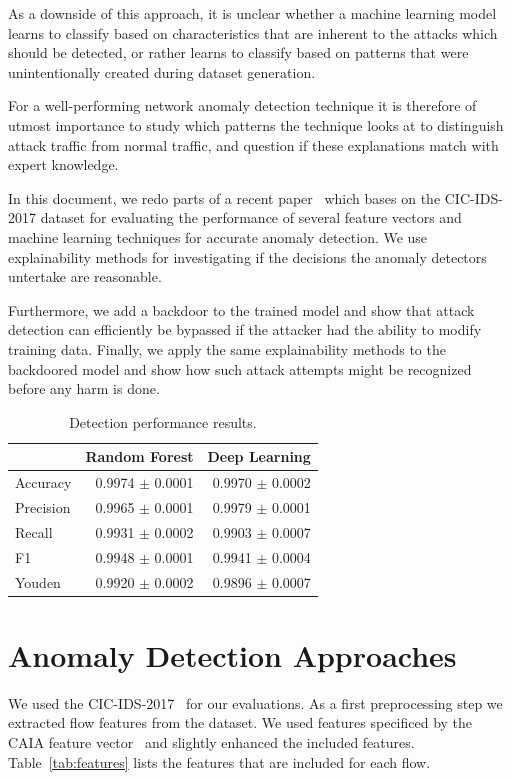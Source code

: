 \documentclass[sigconf,nonacm]{acmart}
\begin{document}
As a downside of this approach, it is unclear whether a machine learning model learns to classify based on characteristics that are inherent to the attacks which should be detected, or rather learns to classify based on patterns that were unintentionally created during dataset generation.

For a well-performing network anomaly detection technique it is therefore of utmost importance to study which patterns the technique looks at to distinguish attack traffic from normal traffic, and question if these explanations match with expert knowledge.

In this document, we redo parts of a recent paper~\cite{fares} which bases on the CIC-IDS-2017 dataset \cite{Sharafaldin2018} for evaluating the performance of several feature vectors and machine learning techniques for accurate anomaly detection. We use explainability methods for investigating if the decisions the anomaly detectors untertake are reasonable.

Furthermore, we add a backdoor to the trained model and show that attack detection can efficiently be bypassed if the attacker had the ability to modify training data. Finally, we apply the same explainability methods to the backdoored model and show how such attack attempts might be recognized before any harm is done.


\begin{table}[b]
\caption{Detection performance results.} \label{tab:performance_results}
\begin{tabular}{l r r} \toprule
& Random Forest & Deep Learning \\ \midrule
Accuracy	&	0.9974 $\pm$ 0.0001	&	0.9970 $\pm$ 0.0002	\\
Precision	&	0.9965 $\pm$ 0.0001	&	0.9979 $\pm$ 0.0001	\\
Recall	&	0.9931 $\pm$ 0.0002	&	0.9903 $\pm$ 0.0007	\\
F1	&	0.9948 $\pm$ 0.0001	&	0.9941 $\pm$ 0.0004	\\
Youden	&	0.9920 $\pm$ 0.0002	&	0.9896 $\pm$ 0.0007	\\
\bottomrule
\end{tabular}
\end{table}

\section{Anomaly Detection Approaches} \label{sec:ml_approaches}
We used the CIC-IDS-2017~\cite{Sharafaldin2018} for our evaluations. As a first preprocessing step we extracted flow features from the dataset. We used features specificed by the CAIA feature vector~\cite{Williams2006} and slightly enhanced the included features. Table~\ref{tab:features} lists the features that are included for each flow.
\end{document}
